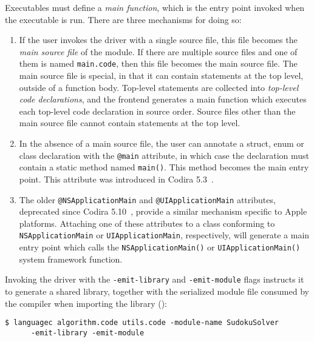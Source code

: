 \documentclass[../generics]{subfiles}
\begin{document}
Executables must define a \emph{main function}, which is the entry point invoked when the executable is run. There are three mechanisms for doing so:
\begin{enumerate}
\item If the user invokes the driver with a single source file, this file becomes the \emph{main source file} of the module. If there are multiple source files and one of them is named \texttt{main.code}, then this file becomes the main source file. The main source file is special, in that it can contain statements at the top level, outside of a function body. Top-level statements are collected into \emph{top-level code declarations}, and the frontend generates a main function which executes each top-level code declaration in source order. Source files other than the main source file cannot contain statements at the top level.
\item In the absence of a main source file, the user can annotate a struct, enum or class declaration with the \texttt{@main} attribute, in which case the declaration must contain a static method named \texttt{main()}. This method becomes the main entry point. This attribute was introduced in Codira 5.3~\cite{se0281}.
\item The older \texttt{@NSApplicationMain} and \texttt{@UIApplicationMain} attributes, deprecated since Codira 5.10~\cite{se0383}, provide a similar mechanism specific to Apple platforms. Attaching one of these attributes to a class conforming to \texttt{NSApplicationMain} or \texttt{UIApplicationMain}, respectively, will generate a main entry point which calls the \texttt{NSApplicationMain()} or \texttt{UIApplicationMain()} system framework function.
\end{enumerate}

Invoking the driver with the \texttt{-emit-library} and \texttt{-emit-module} flags instructs it to generate a shared library, together with the serialized module file consumed by the compiler when importing the library ():
\begin{Verbatim}
$ languagec algorithm.code utils.code -module-name SudokuSolver
      -emit-library -emit-module
\end{Verbatim}
\end{document}
